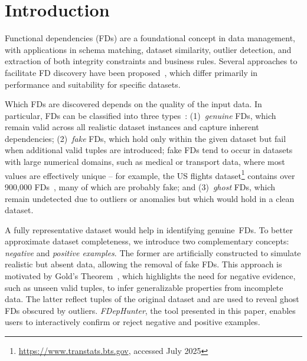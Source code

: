 
\section{Introduction}
Functional dependencies (FDs) are a foundational concept in data management, with applications in schema matching, dataset similarity, outlier detection, and extraction of both integrity constraints and business rules. 
Several approaches to facilitate FD discovery have been proposed~\citep{DBLP:conf/edbt/LopesPL00,DBLP:conf/sigmod/PapenbrockN16,DBLP:journals/pvldb/PapenbrockEMNRZ15}, which differ primarily in performance and suitability for specific datasets.

Which FDs are discovered depends on the %
quality of the input data. In particular, 
FDs can be classified into three types~\citep{DBLP:journals/pvldb/Berti-EquilleHN18}: 
(1)~\emph{genuine} FDs, which remain valid across all realistic dataset instances and capture inherent dependencies; (2)~\emph{fake} FDs, which hold only within the given dataset but fail when additional valid tuples are introduced; fake FDs tend to occur in datasets with large numerical domains, such as medical or transport data, where most values are effectively unique -- for example, the US flights dataset\footnote{\url{https://www.transtats.bts.gov}, accessed July 2025}
contains over 900,000 FDs~\citep{hpi_fds}, many of which are probably fake; and (3)~\emph{ghost} FDs, which remain undetected due to outliers or anomalies but which would hold in a clean dataset.%


A fully representative dataset would help in identifying genuine~FDs.
To better approximate dataset completeness, we introduce two complementary concepts:
\textit{negative} and \textit{positive examples}.
The former are artificially constructed to simulate realistic but absent data, allowing the removal of fake FDs.
This approach is motivated by Gold's Theorem~\citep{DBLP:journals/jsyml/Gold65}, which highlights the need for negative evidence, such as unseen valid tuples, to infer generalizable properties from incomplete data.
The latter reflect tuples of the original dataset and are used to reveal ghost FDs obscured by outliers.
\emph{FDepHunter}, the tool presented in this paper, enables
users to interactively confirm or reject negative and positive examples.

